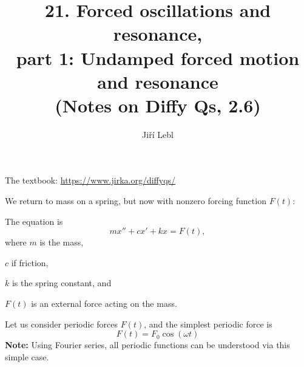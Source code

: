 \documentclass[10pt,aspectratio=169]{beamer}
\author{Ji\v{r}\'i Lebl}
\institute[OSU]{%
Oklahoma State University%
}
\title{21. Forced oscillations and resonance, \\part 1: Undamped forced motion and resonance\\(Notes on Diffy Qs, 2.6)}
\date{}
\begin{document}
\begin{frame}
\titlepage


\begin{center}
The textbook: \url{https://www.jirka.org/diffyqs/}
\end{center}
\end{frame}

\begin{frame}
We return to mass on a spring, but now with nonzero forcing function $F(t)$:

\medskip

\hfill{}\hspace*{\fill}

\medskip
\pause

The equation is
\[
mx'' + cx' + kx = F(t) ,
\]
where $m$ is the mass,

$c$ if friction,

$k$ is the spring constant, and

$F(t)$ is an external force acting on the mass.

\medskip
\pause

Let us consider periodic forces $F(t)$, and the simplest periodic
force is
\[
F(t) = F_0 \cos (\omega t)
\]
\pause
\textbf{Note:} Using Fourier series, all periodic functions can be understood
via this simple case.
\end{frame}
\end{document}
